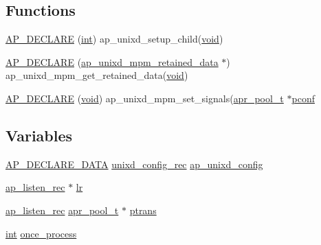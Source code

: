 \subsection*{Functions}
\begin{DoxyCompactItemize}
\item 
\hyperlink{group__APACHE__OS__UNIX_gac52c4437d2d6c952a65b98951c736d6a}{A\+P\+\_\+\+D\+E\+C\+L\+A\+RE} (\hyperlink{pcre_8txt_a42dfa4ff673c82d8efe7144098fbc198}{int}) ap\+\_\+unixd\+\_\+setup\+\_\+child(\hyperlink{group__MOD__ISAPI_gacd6cdbf73df3d9eed42fa493d9b621a6}{void})
\item 
\hyperlink{group__APACHE__OS__UNIX_ga907a3566dc8a714f5dd69eefc720631e}{A\+P\+\_\+\+D\+E\+C\+L\+A\+RE} (\hyperlink{structap__unixd__mpm__retained__data}{ap\+\_\+unixd\+\_\+mpm\+\_\+retained\+\_\+data} $\ast$) ap\+\_\+unixd\+\_\+mpm\+\_\+get\+\_\+retained\+\_\+data(\hyperlink{group__MOD__ISAPI_gacd6cdbf73df3d9eed42fa493d9b621a6}{void})
\item 
\hyperlink{group__APACHE__OS__UNIX_gae1cbe5d58eec75754f0d0f12d4eb3cf4}{A\+P\+\_\+\+D\+E\+C\+L\+A\+RE} (\hyperlink{group__MOD__ISAPI_gacd6cdbf73df3d9eed42fa493d9b621a6}{void}) ap\+\_\+unixd\+\_\+mpm\+\_\+set\+\_\+signals(\hyperlink{structapr__pool__t}{apr\+\_\+pool\+\_\+t} $\ast$\hyperlink{group__APACHE__CORE__CONFIG_gade454c9a3dc13ac389d15bf30f6c92b2}{pconf}
\end{DoxyCompactItemize}
\subsection*{Variables}
\begin{DoxyCompactItemize}
\item 
\hyperlink{ap__config_8h_a0bb4c3adf74510a0dcdad5b125725fe0}{A\+P\+\_\+\+D\+E\+C\+L\+A\+R\+E\+\_\+\+D\+A\+TA} \hyperlink{structunixd__config__rec}{unixd\+\_\+config\+\_\+rec} \hyperlink{group__APACHE__OS__UNIX_gab106efc911ecc78e6334f3004ba45e99}{ap\+\_\+unixd\+\_\+config}
\item 
\hyperlink{structap__listen__rec}{ap\+\_\+listen\+\_\+rec} $\ast$ \hyperlink{group__APACHE__OS__UNIX_gad86a53a31ae797d73195f2f01d5e84bd}{lr}
\item 
\hyperlink{structap__listen__rec}{ap\+\_\+listen\+\_\+rec} \hyperlink{structapr__pool__t}{apr\+\_\+pool\+\_\+t} $\ast$ \hyperlink{group__APACHE__OS__UNIX_gad4c037f30d9f5c212a5cb6116556aae5}{ptrans}
\item 
\hyperlink{pcre_8txt_a42dfa4ff673c82d8efe7144098fbc198}{int} \hyperlink{group__APACHE__OS__UNIX_ga6e36c7f2699dc27d94eefc5009611f6f}{once\+\_\+process}
\end{DoxyCompactItemize}


